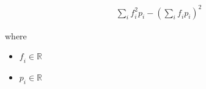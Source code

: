\documentclass[12pt]{article}
\begin{document}
\begin{align*}
\sum_\textit{i} \textit{f}_{ \textit{i} }^{2}\textit{p}_{ \textit{i} } - \left( \sum_\textit{i} \textit{f}_{ \textit{i} }\textit{p}_{ \textit{i} } \right)^{2}
\end{align*}

where
\begin{itemize}
\item $\textit{f}_{\textit{i}} \in \mathbb{{R}}$
\item $\textit{p}_{\textit{i}} \in \mathbb{{R}}$
\end{itemize}
\end{document}
